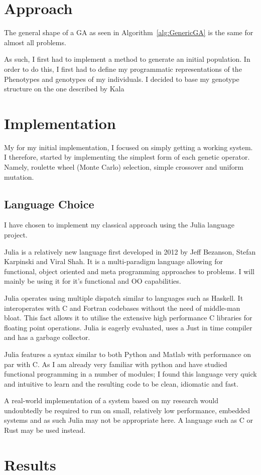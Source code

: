 
\section{Approach}

The general shape of a GA as seen in Algorithm~\ref{alg:GenericGA} is the same for almost all problems. 

As such, I first had to implement a method to generate an initial population. In order to do this, I first had to define my programmatic representations of the Phenotypes and genotypes of my individuals. I decided to base my genotype structure on  the one described by Kala\cite{kalaOnroadIntelligentVehicles2016}

\section{Implementation}

My for my initial implementation, I focused on simply getting a working system. I therefore, started by implementing the simplest form of each genetic operator. Namely, roulette wheel (Monte Carlo\cite{metropolis1987beginning}) selection, simple crossover and uniform mutation. 

\subsection{Language Choice}

I have chosen to implement my classical approach using the Julia language project\cite{JuliaProgrammingLanguage}.

Julia is a relatively new language first developed in 2012 by Jeff Bezanson, Stefan Karpinski and Viral Shah. It is a multi-paradigm language allowing for functional, object oriented and meta programming approaches to problems. I will mainly be using it for it's functional and OO capabilities. 

Julia operates using multiple dispatch similar to languages such as Haskell. It interoperates with C and Fortran codebases without the need of middle-man bloat. This fact allows it to utilise the extensive high performance C libraries for floating point operations. Julia is eagerly evaluated, uses a Just in time compiler and has a garbage collector.

Julia features a syntax similar to both Python and Matlab with performance on par with C. As I am already very familiar with python and have studied functional programming in a number of modules; I found this language very quick and intuitive to learn and the resulting code to be clean, idiomatic and fast.

A real-world implementation of a system based on my research would undoubtedly be required to run on small, relatively low performance, embedded systems and as such Julia may not be appropriate here. A language such as C or Rust may be used instead.
\section{Results}


